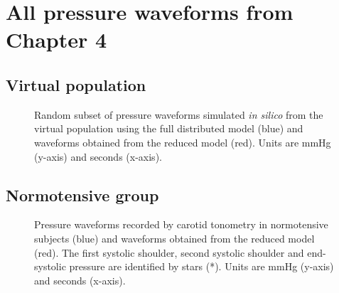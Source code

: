 \section{All pressure waveforms from Chapter 4}
\label{appendix:wave_chIV}
\subsection{Virtual population}
\label{fig:app:IV_virtual}
\begin{figure}[h!]
\centering
{}
\end{figure}
\clearpage
\begin{figure}[h!]
\centering
{}
\caption[Random subset of pressure waveforms simulated \textit{in silico} from the virtual population using the full distributed model and waveforms obtained from the reduced model]{Random subset of pressure waveforms simulated \textit{in silico} from the virtual population using the full distributed model (blue) and waveforms obtained from the reduced model (red). Units are mmHg (y-axis) and seconds (x-axis).}
\end{figure}

\clearpage

\subsection{Normotensive group}
\label{fig:app:IV_normo}
\begin{figure}[h!]
\centering
{}
\end{figure}
\clearpage
\begin{figure}[h!]
\centering
{}
\caption[Pressure waveforms recorded by carotid tonometry in normotensive subjects and waveforms obtained from the reduced model]{Pressure waveforms recorded by carotid tonometry in normotensive subjects (blue) and waveforms obtained from the reduced model (red). The first systolic shoulder, second systolic shoulder and end-systolic pressure are identified by stars (*). Units are mmHg (y-axis) and seconds (x-axis).}
\end{figure}

\clearpage

